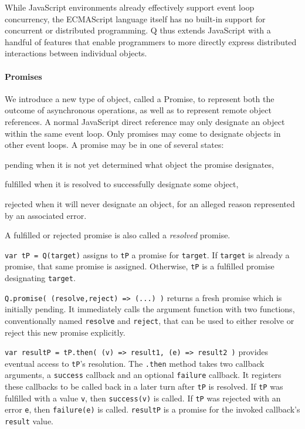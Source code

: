 \documentclass{llncs}
\begin{document}
While JavaScript environments already effectively support event loop concurrency, the ECMAScript language itself has no built-in support for concurrent or distributed programming. Q thus extends JavaScript with a handful of features that enable programmers to more directly express distributed interactions between individual objects.

\paragraph{Promises}

We introduce a new type of object, called a Promise, to represent both the outcome of asynchronous operations, as well as to represent remote object references. A normal JavaScript direct reference may only designate an object within the same event loop. Only promises may come to designate objects in other event loops. A promise may be in one of several states:

\begin{description*}
  \item[pending] when it is not yet determined what object the promise designates,
  \item[fulfilled] when it is resolved to successfully designate some object,
  \item[rejected] when it will never designate an object, for an alleged reason represented by an associated error.
\end{description*}

A fulfilled or rejected promise is also called a \emph{resolved} promise.

\begin{description*}
\item[{\tt var tP = Q(target)}] assigns to {\tt tP} a promise for {\tt target}. If {\tt target} is already a promise, that same promise is assigned. Otherwise, {\tt tP} is a fulfilled promise designating {\tt target}.

\item[{\tt Q.promise( (resolve,reject) => (...) )}] returns a fresh promise which is initially pending. It immediately calls the argument function with two functions, conventionally named {\tt resolve} and {\tt reject}, that can be used to either resolve or reject this new promise explicitly. 

\item[{\tt var resultP = tP.then( (v) => result1, (e) => result2 )}] provides eventual access to {\tt tP}'s resolution. The {\tt .then} method takes two callback arguments, a \texttt{success} callback and an optional \texttt{failure} callback. It registers these callbacks to be called back in a later turn after {\tt tP} is resolved. If {\tt tP} was fulfilled with a value {\tt v}, then {\tt success(v)} is called. If {\tt tP} was rejected with an error {\tt e}, then {\tt failure(e)} is called. {\tt resultP} is a promise for the invoked callback's {\tt result} value. 
\end{description*}
\end{document}
